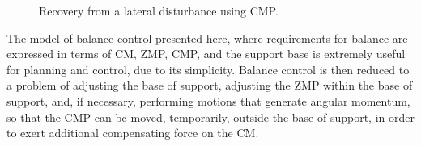 \documentclass{llncs}
\begin{document}
\begin{figure}[b]
 \vspace{-10pt}
\caption{Recovery from a lateral disturbance using CMP.}
\label{fig:LateralDisturbanceRecovery}
\end{figure}

The model of balance control presented here, where requirements for balance are expressed in terms of CM, ZMP, CMP, and the support base 
is extremely useful for planning and control, due to its simplicity.  
Balance control is then reduced to a problem of adjusting the base of support, adjusting the ZMP within the base of support, and, if necessary, performing motions 
that generate angular momentum, so that the CMP can be moved, temporarily, outside the base of support, in order to exert additional compensating force on the CM.
\end{document}
